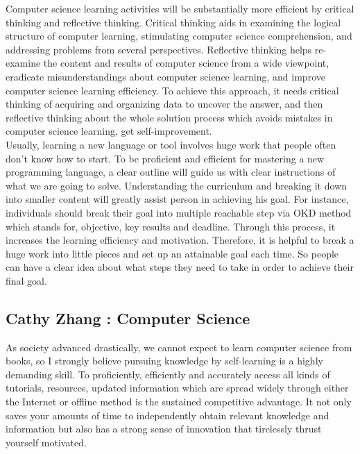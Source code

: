\documentclass[a4paper, 11pt]{report}
\begin{document}
\noindent Computer science learning activities will be substantially more efficient by critical thinking and reflective thinking. Critical thinking aids in examining the logical structure of computer learning, stimulating computer science comprehension, and addressing problems from several perspectives. Reflective thinking helps re-examine the content and results of computer science from a wide viewpoint, eradicate misunderstandings about computer science learning, and improve computer science learning efficiency. To achieve this approach, it needs critical thinking of acquiring and organizing data to uncover the answer, and then reflective thinking about the whole solution process which avoids mistakes in computer science learning, get self-improvement.\\

\noindent Usually, learning a new language or tool involves huge work that people often don't know how to start. To be proficient and efficient for mastering a new programming language, a clear outline will guide us with clear instructions of what we are going to solve. Understanding the curriculum and breaking it down into smaller content will greatly assist person in achieving his goal. For instance, individuals should break their goal into multiple reachable step via OKD method which stands for,  objective, key results and deadline. Through this process, it increases the learning efficiency and motivation. Therefore, it is helpful to break a huge work into little pieces and set up an attainable goal each time. So people can have a clear idea about what steps they need to take in order to achieve their final goal.\\ 

\subsection{Cathy Zhang : Computer Science}
\noindent As society advanced drastically, we cannot expect to learn computer science from books, so I strongly believe pursuing knowledge by self-learning is a highly demanding skill. To proficiently, efficiently and accurately access all kinds of tutorials, resources, updated information which are spread widely through either the Internet or offline method is the sustained competitive advantage. It not only saves your amounts of time to independently obtain relevant knowledge and information but also has a strong sense of innovation that tirelessly thrust yourself motivated.\\
\end{document}
